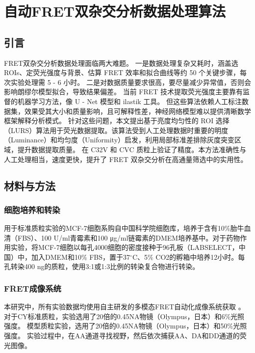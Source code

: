 \chapter{自动FRET双杂交分析数据处理算法}

\section{引言}

\ifshowtext
FRET双杂交分析数据处理面临两大难题。
一是数据处理复杂又耗时，涵盖选 ROIs、定荧光强度与背景、估算 FRET 效率和拟合曲线等约 50 个关键步骤，每次实验处理需 5 - 6 小时。
二是对数据质量要求很高，要尽量减少异常值，否则会影响朗缪尔模型拟合，导致结果偏差。
当前 FRET 技术提取荧光强度主要靠有监督的机器学习方法，像 U - Net 模型和 ilastik 工具。
但这些算法依赖人工标注数据集，效果受其大小和质量影响，且可解释性差，神经网络模型难以提供清晰数学框架解释分析模式。
针对这些问题，本文提出基于亮度均匀性的 ROI 选择（LURS）算法用于荧光数据提取。该算法受到人工处理数据时重要的明度（Luminance）和均匀度（Uniformity）启发，利用局部标准差排除灰度突变区域，提升数据提取质量。
在 C32V 和 CVC 质粒上验证了精度。本方法准确性与人工处理相当，速度更快，提升了 FRET 双杂交分析在高通量筛选中的实用性。
\fi

\section{材料与方法}

\ifshowtext
\fi

\subsection{细胞培养和转染}
\label{sec:细胞转染}
\ifshowtext
用于标准质粒实验的MCF-7细胞系购自中国科学院细胞库，培养于含有10\%胎牛血清（FBS）、100 U/ml青霉素和100 μg/ml链霉素的DMEM培养基中。对于药物作用实验，将MCF-7细胞以每孔4000细胞的密度接种于96孔板（LABSELECT，中国）中，加入DMEM和10\% FBS，置于37$^\circ \text{C}$、5\% CO2的孵箱中培养12小时。每孔转染400 ng的质粒，使用3:1或1:3比例的转染复合物进行转染。
\fi

\subsection{FRET成像系统}
\label{sec:成像条件}
\ifshowtext
本研究中，所有实验数据均使用自主研发的多模态FRET自动化成像系统获取 。
对于CY标准质粒，实验选用了20倍的0.45NA物镜（Olympus，日本）和6\%光照强度。
模型质粒实验，选用了20倍的0.45NA物镜（Olympus，日本）和50\%光照强度。
实验过程中，在AA通道寻找视野，然后依次捕获AA、DA和DD通道的荧光图像。

